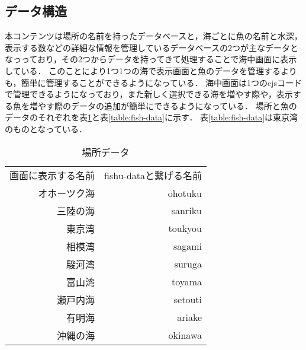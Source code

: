 \documentclass[12pt,a4j,titlepage]{ltjsarticle}
\begin{document}
\subsection{データ構造}
本コンテンツは場所の名前を持ったデータベースと，海ごとに魚の名前と水深，表示する数などの詳細な情報を管理しているデータベースの2つが主なデータとなっっており，その2つからデータを持ってきて処理することで海中画面に表示している．
このことにより1つ1つの海で表示画面と魚のデータを管理するよりも，簡単に管理することができるようになっている．
海中画面は1つのejsコードで管理できるようになっており，また新しく選択できる海を増やす際や，表示する魚を増やす際のデータの追加が簡単にできるようになっている．
場所と魚のデータのそれぞれを表\ref{table:place}と表\ref{table:fish-data}に示す．
表\ref{table:fish-data}は東京湾のものとなっている．
\begin{table}[h]
\centering
  \caption{場所データ}
  \label{table:place}
  \small
  \begin{tabular}{rr}
  画面に表示する名前 & fishu-dataと繋げる名前  \\
  オホーツク海 & 　ohotuku  \\
  三陸の海 & sanriku  \\
  東京湾 & toukyou  \\
  相模湾 & sagami  \\
  駿河湾 & suruga  \\
  富山湾 & toyama  \\
  瀬戸内海 & setouti  \\
  有明海 & ariake  \\
  沖縄の海 & okinawa  \\
  \end{tabular}
  \end{table}
\end{document}
